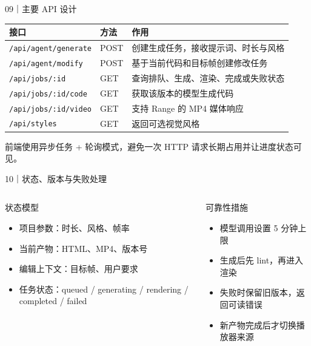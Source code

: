 \documentclass[aspectratio=169,UTF8,11pt]{ctexbeamer}
\begin{document}
\begin{frame}{09｜主要 API 设计}
  \small
  \begin{tabularx}{\textwidth}{@{}p{3.8cm}p{1.45cm}X@{}}
    \toprule
    \textbf{接口} & \textbf{方法} & \textbf{作用} \\
    \midrule
    \texttt{/api/agent/generate} & POST & 创建生成任务，接收提示词、时长与风格 \\
    \texttt{/api/agent/modify} & POST & 基于当前代码和目标帧创建修改任务 \\
    \texttt{/api/jobs/:id} & GET & 查询排队、生成、渲染、完成或失败状态 \\
    \texttt{/api/jobs/:id/code} & GET & 获取该版本的模型生成代码 \\
    \texttt{/api/jobs/:id/video} & GET & 支持 Range 的 MP4 媒体响应 \\
    \texttt{/api/styles} & GET & 返回可选视觉风格 \\
    \bottomrule
  \end{tabularx}
  \vspace{0.25cm}

  \scriptsize 前端使用异步任务 + 轮询模式，避免一次 HTTP 请求长期占用并让进度状态可见。
\end{frame}

\begin{frame}{10｜状态、版本与失败处理}
  \begin{columns}[T,onlytextwidth]
      \begin{block}{状态模型}
        \begin{itemize}
          \item 项目参数：时长、风格、帧率
          \item 当前产物：HTML、MP4、版本号
          \item 编辑上下文：目标帧、用户要求
          \item 任务状态：queued / generating / rendering / completed / failed
        \end{itemize}
      \end{block}
      \begin{block}{可靠性措施}
        \begin{itemize}
          \item 模型调用设置 5 分钟上限
          \item 生成后先 lint，再进入渲染
          \item 失败时保留旧版本，返回可读错误
          \item 新产物完成后才切换播放器来源
        \end{itemize}
      \end{block}
  \end{columns}
\end{frame}
\end{document}
